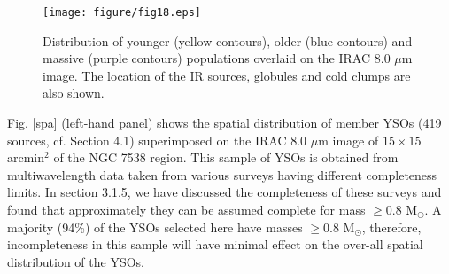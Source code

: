 \documentclass[a4paper,fleqn,usenatbib,useAMS]{mnras}
\begin{document}
\begin{figure*}
\centering
\centering\texttt{[image: figure/fig18.eps]}
\caption{\label{spaage} Distribution of younger (yellow contours), older (blue contours) and massive (purple contours) 
populations overlaid on the IRAC 8.0 $\mu$m image. 
The location of the IR sources, globules and cold clumps are also shown.
}
\end{figure*}



Fig. \ref{spa} (left-hand panel) shows the spatial distribution of
member YSOs (419 sources, cf. Section 4.1)
superimposed on the IRAC 8.0 $\mu$m  image of $15\times15$ arcmin$^2$ of the NGC 7538 region.
This sample of YSOs is obtained from 
multiwavelength data  taken from  various surveys having 
different completeness limits. 
In section 3.1.5, we have discussed  the completeness of these surveys
and found that approximately they can be assumed complete for mass $\geq$0.8 M$_\odot$.
A majority (94\%) of the YSOs selected here have masses $\geq$0.8 M$_\odot$,
therefore, incompleteness in this sample will have minimal effect on the over-all spatial distribution of the YSOs.
\end{document}
